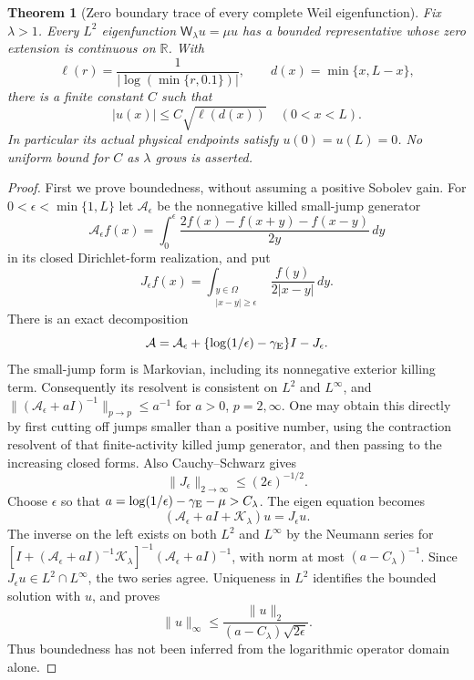 \documentclass[11pt]{article}
\newtheorem{theorem}{Theorem}[section]
\theoremstyle{remark}
\begin{document}
\begin{theorem}[Zero boundary trace of every complete Weil eigenfunction]
\label{thm:v118-eigen-endpoint-zero}
Fix $\lambda>1$.  Every $L^2$ eigenfunction
$\mathsf W_\lambda u=\mu u$ has a bounded representative whose zero
extension is continuous on $\mathbb R$.  With
\[
 \ell(r)=\frac1{|\log(\min\{r,0.1\})|},\qquad
 d(x)=\min\{x,L-x\},
\]
there is a finite constant $C$ such that
\begin{equation}\label{eq:v118-eigen-boundary-decay}
 |u(x)|\le C\sqrt{\ell(d(x))}\quad(0<x<L).
\end{equation}
In particular its actual physical endpoints satisfy $u(0)=u(L)=0$.
No uniform bound for $C$ as $\lambda$ grows is asserted.
\end{theorem}
\begin{proof}
First we prove boundedness, without assuming a positive Sobolev gain.
For $0<\epsilon<\min\{1,L\}$ let $\mathcal A_\epsilon$ be the
nonnegative killed small-jump generator
\[
 \mathcal A_\epsilon f(x)=\int_0^\epsilon
       \frac{2f(x)-f(x+y)-f(x-y)}{2y}\,dy
\]
in its closed Dirichlet-form realization, and put
\[
 J_\epsilon f(x)=\int_{\substack{y\in\Omega\\|x-y|\ge\epsilon}}
                    \frac{f(y)}{2|x-y|}\,dy.
\]
There is an exact decomposition
\[
 \mathcal A=\mathcal A_\epsilon+
       \{\log(1/\epsilon)-\gamma_{\rm E}\}I-J_\epsilon.
\]
The small-jump form is Markovian, including its nonnegative exterior
killing term.  Consequently its resolvent is consistent on $L^2$
and $L^\infty$, and
$\|(\mathcal A_\epsilon+aI)^{-1}\|_{p\to p}\le a^{-1}$ for
$a>0$, $p=2,\infty$.  One may obtain this directly by first cutting
off jumps smaller than a positive number, using the contraction
resolvent of that finite-activity killed jump generator, and then
passing to the increasing closed forms.  Also Cauchy--Schwarz gives
\[
 \|J_\epsilon\|_{2\to\infty}\le(2\epsilon)^{-1/2}.
\]
Choose $\epsilon$ so that
$a=\log(1/\epsilon)-\gamma_{\rm E}-\mu>C_\lambda$.
The eigen equation becomes
\[
 (\mathcal A_\epsilon+aI+\mathcal K_\lambda)u=J_\epsilon u.
\]
The inverse on the left exists on both $L^2$ and $L^\infty$ by the
Neumann series for
$[I+(\mathcal A_\epsilon+aI)^{-1}\mathcal K_\lambda]^{-1}
 (\mathcal A_\epsilon+aI)^{-1}$, with norm at most
$(a-C_\lambda)^{-1}$.  Since $J_\epsilon u\in L^2\cap L^\infty$,
the two series agree.  Uniqueness in $L^2$ identifies the bounded
solution with $u$, and proves
\[
 \|u\|_\infty\le
   \frac{\|u\|_2}{(a-C_\lambda)\sqrt{2\epsilon}}.
\]
Thus boundedness has not been inferred from the logarithmic operator
domain alone.


\end{proof}
\end{document}
